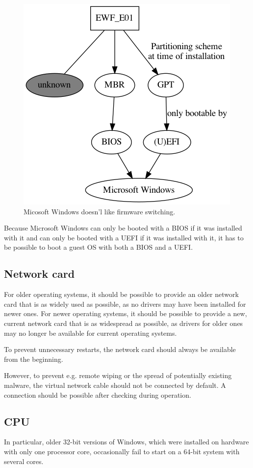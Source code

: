 \begin{figure}[htbp]  %
  \centering
  \includegraphics[width=.5\textwidth]{figures/ps-vs-firmware-win.png}
  \caption[Windows fireware dependency]{Micosoft Windows doesn'l like firmware switching.}
  \label{fig:firmware}
\end{figure}

Because Microsoft Windows can only be booted with a BIOS if it was installed with it and can only be booted with a UEFI if it was installed with it, it has to be possible to boot a guest OS with both a BIOS and a UEFI.

\subsection{Network card}

For older operating systems, it should be possible to provide an older network card that is as widely used as possible, as no drivers may have been installed for newer ones.
For newer operating systems, it should be possible to provide a new, current network card that is as widespread as possible, as drivers for older ones may no longer be available for current operating systems.

To prevent unnecessary restarts, the network card should always be available from the beginning.

However, to prevent e.g. remote wiping or the spread of potentially existing malware, the virtual network cable should not be connected by default. A connection should be possible after checking during operation.

\subsection{CPU}

In particular, older 32-bit versions of Windows, which were installed on hardware with only one processor core, occasionally fail to start on a 64-bit system with several cores.


